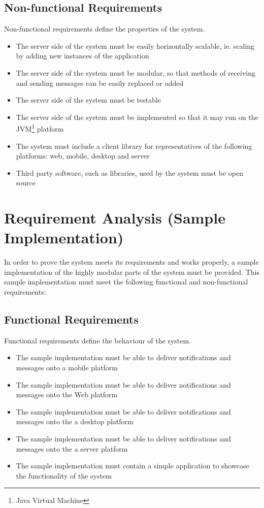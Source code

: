\subsection{Non-functional Requirements}
Non-functional requirements define the properties of the system.
\begin{itemize}
\item The server side of the system must be easily horizontally scalable, ie. scaling by adding new instances of the application
\item The server side of the system must be modular, so that methods of receiving and sending messages can be easily replaced or added
\item The server side of the system must be testable
\item The server side of the system must be implemented so that it may run on the JVM\footnote{Java Virtual Machine} platform
\item The system must include a client library for representatives of the following platforms: web, mobile, desktop and server
\item Third party software, such as libraries, used by the system must be open source
\end{itemize}

\section{Requirement Analysis (Sample Implementation)} \label{sec:sample-implementation-analysis}

In order to prove the system meets its requirements and works properly, a sample implementation of the highly modular parts of the system must be provided. This sample implementation must meet the following functional and non-functional requirements:

\subsection{Functional Requirements}\label{sec:s-impl-func-req}
Functional requirements define the behaviour of the system.
\begin{itemize}
\item The sample implementation must be able to deliver notifications and messages onto a mobile platform
\item The sample implementation must be able to deliver notifications and messages onto the Web platform
\item The sample implementation must be able to deliver notifications and messages onto the a desktop platform
\item The sample implementation must be able to deliver notifications and messages onto the a server platform
\item The sample implementation must contain a simple application to showcase the functionality of the system
\end{itemize}

